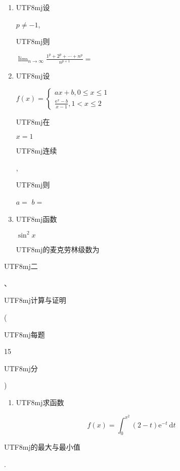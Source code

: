 \documentclass[10pt]{article}
\begin{document}
\begin{enumerate}
  \item \begin{CJK}{UTF8}{mj}设\end{CJK} $p \neq-1$, \begin{CJK}{UTF8}{mj}则\end{CJK} $\lim _{n \rightarrow \infty} \frac{1^{p}+2^{p}+\cdots+n^{p}}{n^{p+1}}=$

  \item \begin{CJK}{UTF8}{mj}设\end{CJK} $f(x)=\left\{\begin{array}{l}a x+b, 0 \leq x \leq 1 \\ \frac{\mathrm{e}^{x}-b}{x-1}, 1<x \leq 2\end{array}\right.$ \begin{CJK}{UTF8}{mj}在\end{CJK} $x=1$ \begin{CJK}{UTF8}{mj}连续\end{CJK}, \begin{CJK}{UTF8}{mj}则\end{CJK} $a=$ $b=$

  \item \begin{CJK}{UTF8}{mj}函数\end{CJK} $\sin ^{2} x$ \begin{CJK}{UTF8}{mj}的麦克劳林级数为\end{CJK}

\end{enumerate}
\begin{CJK}{UTF8}{mj}二\end{CJK}、\begin{CJK}{UTF8}{mj}计算与证明\end{CJK} (\begin{CJK}{UTF8}{mj}每题\end{CJK} 15\begin{CJK}{UTF8}{mj}分\end{CJK})

\begin{enumerate}
  \item \begin{CJK}{UTF8}{mj}求函数\end{CJK}
\end{enumerate}
$$
f(x)=\int_{0}^{x^{2}}(2-t) \mathrm{e}^{-t} \mathrm{~d} t
$$
\begin{CJK}{UTF8}{mj}的最大与最小值\end{CJK}.
\end{document}
